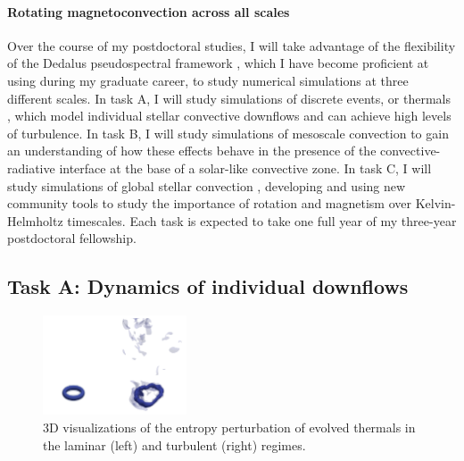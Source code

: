 \documentclass[11pt, preprint]{aastex}
\begin{document}
\paragraph{Rotating magnetoconvection across all scales}
Over the course of my postdoctoral studies, I will take advantage of the flexibility of the Dedalus pseudospectral framework \citep{burns&all2019}, which I have become proficient at using during my graduate career, to study numerical simulations at three different scales.
In task A, I will study simulations of discrete events, or thermals \citep[as in][]{andersLB2019}, which model individual stellar convective downflows and can achieve high levels of turbulence.
In task B, I will study simulations of mesoscale convection \citep[as in][]{anders&brown2017} to gain an understanding of how these effects behave in the presence of the convective-radiative interface at the base of a solar-like convective zone.
In task C, I will study simulations of global stellar convection \citep[as in][]{lecoanet&all2018}, developing and using new community tools to study the importance of rotation and magnetism over Kelvin-Helmholtz timescales.
Each task is expected to take one full year of my three-year postdoctoral fellowship.

\vspace{-0.8cm}
\subsection*{Task A: Dynamics of individual downflows}
\vspace{-0.3cm}
\label{sct:taskA}
\begin{figure}
	\begin{center}
	\vspace{-10pt}
    \includegraphics[width=0.38\textwidth]{./figs/thermals_comparison.png}
	\vspace{-16pt}
	\end{center}
    \caption{
	3D visualizations of the entropy perturbation of evolved thermals in the laminar (left) and turbulent (right) regimes.
	\label{fig:thermals_comparison} }
\end{figure}
\end{document}
